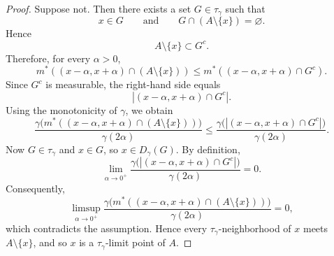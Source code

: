 \documentclass[10pt,a4paper]{amsart}
\begin{document}
\begin{proof}
Suppose not. Then there exists a set $G\in\tau_{\gamma}$ such that
$$
x\in G
\qquad\text{and}\qquad
G\cap (A\setminus\{x\})=\varnothing.
$$
Hence
$$
A\setminus\{x\}\subset G^c.
$$
Therefore, for every $\alpha>0$,
$$
m^*((x-\alpha,x+\alpha)\cap (A\setminus\{x\}))
\le
m^*((x-\alpha,x+\alpha)\cap G^c).
$$
Since $G^c$ is measurable, the right-hand side equals
$$
|(x-\alpha,x+\alpha)\cap G^c|.
$$
Using the monotonicity of $\gamma$, we obtain
$$
\frac{\gamma\bigl(m^*((x-\alpha,x+\alpha)\cap (A\setminus\{x\}))\bigr)}{\gamma(2\alpha)}
\le
\frac{\gamma\bigl(|(x-\alpha,x+\alpha)\cap G^c|\bigr)}{\gamma(2\alpha)}.
$$
Now $G\in\tau_{\gamma}$ and $x\in G$, so $x\in D_{\gamma}(G)$. By definition,
$$
\lim_{\alpha\to 0^+}
\frac{\gamma\bigl(|(x-\alpha,x+\alpha)\cap G^c|\bigr)}{\gamma(2\alpha)}
=0.
$$
Consequently,
$$
\limsup_{\alpha \to 0^+}
\frac{\gamma\bigl(m^*((x-\alpha,x+\alpha)\cap (A\setminus\{x\}))\bigr)}{\gamma(2\alpha)}
=0,
$$
which contradicts the assumption. Hence every $\tau_{\gamma}$-neighborhood of $x$ meets $A\setminus\{x\}$, and so $x$ is a $\tau_{\gamma}$-limit point of $A$.
\end{proof}
\end{document}
